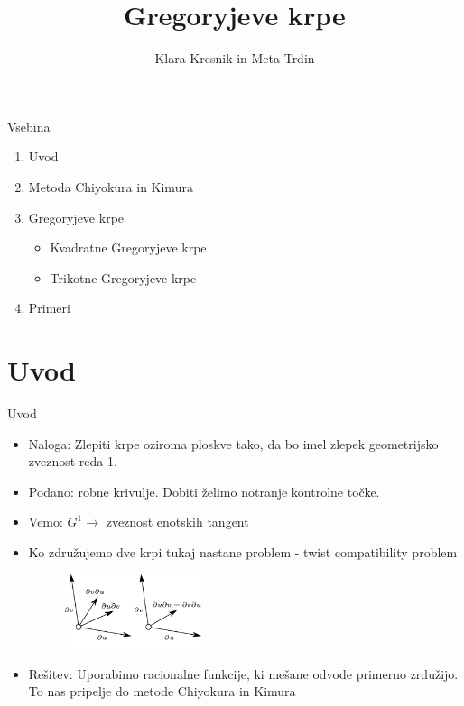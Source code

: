 \documentclass[a4paper,8pt]{beamer}
\title{Gregoryjeve krpe}
\author{Klara Kresnik in Meta Trdin} %
\institute[FMF]{Fakulteta za matematiko in fiziko}
\date{}
\begin{document}
\begin{frame}
\maketitle
\end{frame}

\begin{frame}{Vsebina}

\fontsize{14pt}{7.2}\selectfont

\begin{enumerate}
	\item Uvod
	\item Metoda Chiyokura in Kimura
	\item Gregoryjeve krpe
	\begin{itemize}
		\fontsize{10pt}{7.2}\selectfont
		\item Kvadratne Gregoryjeve krpe
		\item Trikotne Gregoryjeve krpe
	\end{itemize}
    \item Primeri
\end{enumerate}

\end{frame}

\section{Uvod}
\begin{frame}{Uvod}
\begin{itemize}
	\item Naloga: Zlepiti krpe oziroma ploskve tako, da bo imel zlepek geometrijsko zveznost reda 1. 	\item Podano: robne krivulje. Dobiti želimo notranje kontrolne točke.
	\item Vemo: $G^1 \rightarrow$ zveznost enotskih tangent
	\item Ko združujemo dve krpi tukaj nastane problem - twist compatibility problem
	\pause
	\begin{figure}[h]
		\centering
		\includegraphics[width=4cm]{mesani_odvodi_ob.jpg}
	\end{figure}
	
	\item Rešitev: Uporabimo racionalne funkcije, ki mešane odvode primerno zrdužijo. To nas pripelje do metode Chiyokura in Kimura

	
\end{itemize}

\end{frame}
\end{document}
